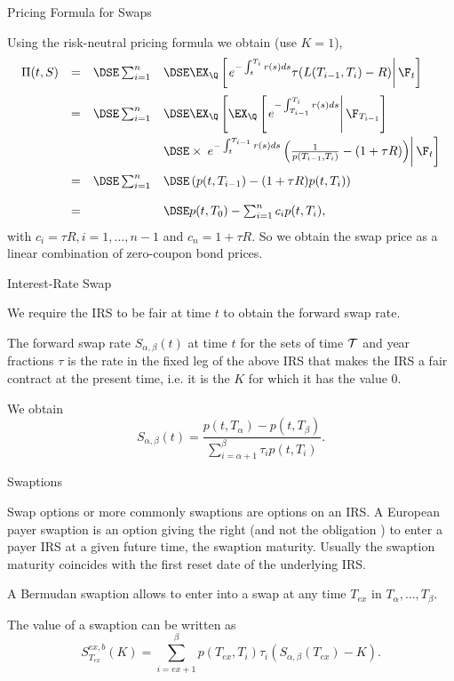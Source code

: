 {Pricing Formula for  Swaps}

Using the risk-neutral pricing  formula we obtain (use $K=1$),
{\tiny
$$
\begin{array}{llll}
\Pi(t,S) &=& \DSE \sum_{i=1}^n &\DSE \EX_{\Q}\left[\left.e^{-
\int_t^{T_i} r(s)ds} \tau(L(T_{i-1},T_{i})-R)\right|\F_t\right]\\*[12pt]
&=&\DSE \sum_{i=1}^n &\DSE \EX_{\Q}\left[\EX_{\Q}\left[\left.e^{-
\int_{T_{i-1}}^{T_i}
r(s)ds}\right|\F_{T_{i-1}}\right]\right.\\*[12pt] & & &\DSE \times
\left. \left.e^{- \int_t^{T_{i-1}} r(s)ds}
\left(\frac{1}{p(T_{i-1},T_i)}-(1+ \tau
R)\right)\right|\F_t\right]\\*[12pt] &=&\DSE \sum_{i=1}^n &\DSE
\left( p(t,T_{i-1})-(1 + \tau R) p(t,T_i)\right) \\*[12pt]
&=&&\DSE p(t,T_0) -
\sum_{i=1}^n c_i p(t,T_i),
\end{array}
$$
}
with $c_i=\tau R, i=1, \ldots, n-1$ and $c_n = 1+\tau R$. So we obtain the
swap price as a linear combination of zero-coupon bond prices.

{Interest-Rate Swap}

\item<1-> We require the IRS to be fair at time $t$ to obtain the
forward swap rate.
\item<2->
The forward swap rate $S_{\alpha,\beta}(t)$ at time $t$ for the
sets of time $\cal T$ and year fractions $\tau$ is the rate in the
fixed leg of the above IRS that makes the IRS a fair contract at
the present time, i.e. it is the $K$ for which
it has the value $0$.
\item<3->
 We obtain
\begin{equation}\label{FSR-1}
S_{\alpha,\beta}(t)=\frac{p(t,T_{\alpha})-p(t,T_{\beta})}{\sum_{i=\alpha+1}^{\beta}\tau_ip(t,T_i)}.
\end{equation}

{Swaptions}
\item<1->Swap options or more commonly swaptions are options on an IRS. A
European payer swaption is an option giving the right (and not the
obligation ) to enter a payer IRS at a given future time, the
swaption maturity. Usually the swaption maturity coincides with
the first reset date of the underlying IRS.
\item<2->
A Bermudan swaption allows to enter into a swap at any time $T_{ex}$ in $T_\alpha, \ldots,
T_\beta$.
\item<3-> The value of  a swaption can be written as
$$
S_{T_{ex}}^{ex,b}(K)= \sum_{i=ex+1}^{\beta} p(T_{ex},T_i)\tau_i(S_{\alpha,\beta}(T_{ex})-K).
$$


